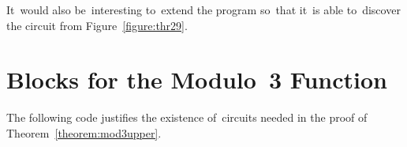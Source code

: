 It~would also be~interesting to~extend the program 
so~that it~is able to~discover the circuit from Figure~\ref{figure:thr29}.



\appendix
\section{Blocks for the Modulo~3 Function}
The following code justifies the existence of~circuits needed in the proof of Theorem~\ref{theorem:mod3upper}.
\inputminted{python}{mod3_check.py}

